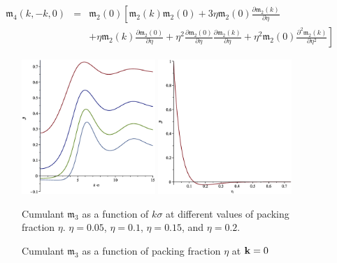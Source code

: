 \begin{eqnarray}
	\label{recur_m4_m2}
	\mathfrak{m}_4(k, -k, 0) &=& \mathfrak{m}_2(0) 
	\left[
		\mathfrak{m}_2(k)\mathfrak{m}_2(0) + 3\eta\mathfrak{m}_2(0)\frac{\partial\mathfrak{m}_2(k)}{\partial\eta}
	\right.
	\nonumber\\
	&& \left. 
	+ \eta\mathfrak{m}_2(k)\frac{\partial\mathfrak{m}_2(0)}{\partial\eta} 
	+ \eta^2\frac{\partial\mathfrak{m}_2(0)}{\partial\eta} \frac{\partial\mathfrak{m}_2(k)}{\partial\eta}
	+ \eta^2\mathfrak{m}_2(0)\frac{\partial^2\mathfrak{m}_2(k)}{\partial\eta^2}
	\right]
\end{eqnarray}

\begin{figure}[htbp]
	\includegraphics[width=0.45\textwidth,angle=0]{M3_as_function_of_k_at_different_eta} \hfill
	\includegraphics[width=0.45\textwidth,angle=0]{M3_as_function_of_eta_at_k_equals_0} \\
	\parbox{0.5\textwidth}{\caption{\label{m3_vs_k} Cumulant $\mathfrak{m}_3$ as a function of $k\sigma$ at different values of packing fraction $\eta$. $\eta = 0.05$, $\eta=0.1$, $\eta = 0.15$, and $\eta=0.2$.
	}} \hfill
	\parbox{0.45\textwidth}{\caption{\label{m3_vs_eta} Cumulant $\mathfrak{m}_3$ as a function of packing fraction $\eta$ at $\vb k = 0$
	}}
\end{figure}
